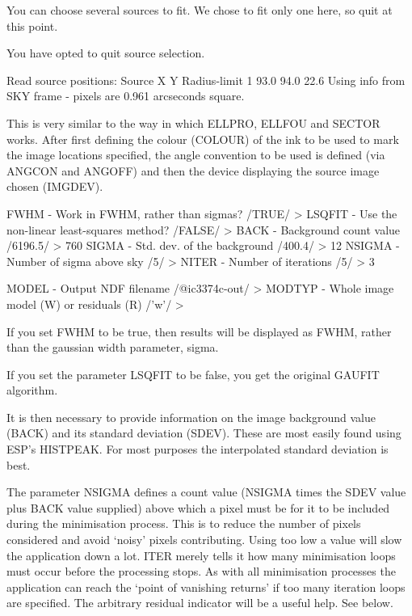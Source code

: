 \documentclass[twoside,11pt]{starlink}
\begin{document}
You can choose several sources to fit.  We chose to fit only one here,
so quit at this point.

\begin{terminalv}
You have opted to quit source selection.

Read source positions:
  Source     X      Y   Radius-limit
     1      93.0   94.0   22.6
Using info from SKY frame - pixels are  0.961 arcseconds square.
\end{terminalv}

This is very similar to the way in which ELLPRO, ELLFOU and SECTOR works.
After first defining the colour (COLOUR) of the ink to be used to mark the
image locations specified, the angle convention to be used is
defined (via ANGCON and ANGOFF) and then the device displaying the
source image chosen (IMGDEV).


\begin{terminalv}
FWHM - Work in FWHM, rather than sigmas? /TRUE/ >
LSQFIT - Use the non-linear least-squares method? /FALSE/ >
BACK - Background count value /6196.5/ > 760
SIGMA - Std. dev. of the background /400.4/ > 12
NSIGMA - Number of sigma above sky /5/ >
NITER - Number of iterations /5/ > 3


MODEL - Output NDF filename /@ic3374c-out/ >
MODTYP - Whole image model (W) or residuals (R) /'w'/ >
\end{terminalv}
If you set FWHM to be
true, then results will be displayed as FWHM, rather than the gaussian
width parameter, sigma.


If you set the parameter LSQFIT to be false, you get the original
GAUFIT algorithm.

It is then necessary to provide information on the image background value
(BACK) and its standard deviation (SDEV). These are most easily found
using ESP's HISTPEAK. For most purposes the interpolated standard deviation is
best.

The parameter NSIGMA defines a count value (NSIGMA times the SDEV value
plus BACK value supplied)
above which a pixel must be
for it to be included during the minimisation process. This is to reduce
the number of pixels considered and avoid `noisy' pixels contributing.
Using too low a value will slow the application down a lot.
ITER merely tells it how many minimisation loops must occur before the
processing stops. As with all minimisation processes the application can
reach the `point of vanishing returns' if too many iteration loops are
specified. The arbitrary residual indicator will be a useful help. See below.
\end{document}
